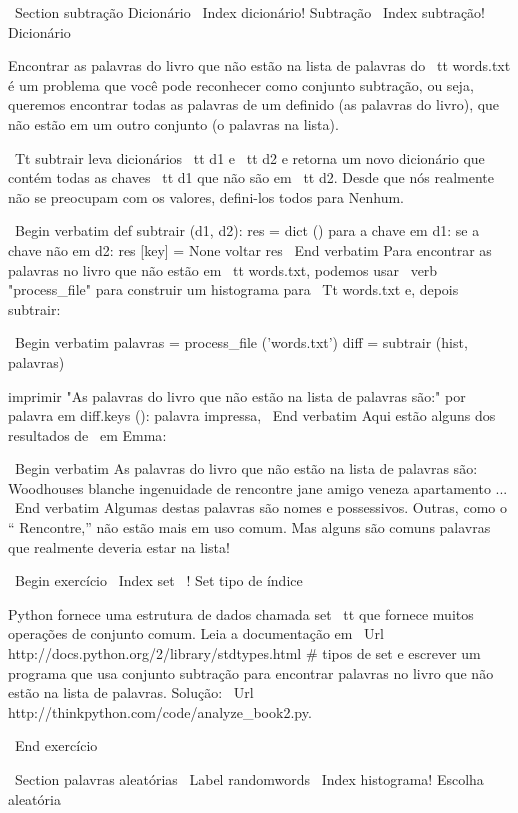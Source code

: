 \documentclass[10pt]{book}
\begin{document}
\begin {itemize}
{{{{{{{{{\ Section {} subtração Dicionário
\ Index {dicionário! Subtração}
\ Index {subtração! Dicionário}

Encontrar as palavras do livro que não estão na lista de palavras
do {\ tt words.txt} é um problema que você pode reconhecer como conjunto
subtração, ou seja, queremos encontrar todas as palavras de um
definido (as palavras do livro), que não estão em um outro conjunto (o
palavras na lista).

{\ Tt subtrair} leva dicionários {\ tt d1} e {\ tt d2} e retorna um
novo dicionário que contém todas as chaves {\ tt d1} que não são
em {\ tt d2}. Desde que nós realmente não se preocupam com os valores,
defini-los todos para Nenhum.

\ Begin {verbatim}
def subtrair (d1, d2):
    res = dict ()
    para a chave em d1:
        se a chave não em d2:
            res [key] = None
    voltar res
\ End {verbatim}
%
Para encontrar as palavras no livro que não estão em {\ tt words.txt},
podemos usar \ verb "process_file" para construir um histograma para
{\ Tt words.txt} e, depois subtrair:

\ Begin {verbatim}
palavras = process_file ('words.txt')
diff = subtrair (hist, palavras)

imprimir "As palavras do livro que não estão na lista de palavras são:"
por palavra em diff.keys ():
    palavra impressa,
\ End {verbatim}
%
Aqui estão alguns dos resultados de {\ em Emma}:

\ Begin {verbatim}
As palavras do livro que não estão na lista de palavras são:
 Woodhouses blanche ingenuidade de rencontre jane 
amigo veneza apartamento ...
\ End {verbatim}
%
Algumas destas palavras são nomes e possessivos. Outras, como o
`` Rencontre,'' não estão mais em uso comum. Mas alguns são comuns
palavras que realmente deveria estar na lista!

\ Begin {} exercício
\ Index {set}
\ {!} Set tipo de índice

Python fornece uma estrutura de dados chamada {set \ tt} que fornece muitos
operações de conjunto comum. Leia a documentação em
\ Url {http://docs.python.org/2/library/stdtypes.html # tipos de set} e
escrever um programa que usa conjunto subtração para encontrar palavras no livro
que não estão na lista de palavras. Solução:
\ Url {http://thinkpython.com/code/analyze_book2.py}.

\ End {} exercício


\ Section {palavras aleatórias}
\ Label {} randomwords
\ Index {histograma! Escolha aleatória}

}}}}}}}}}
\end{itemize}
\end{document}
